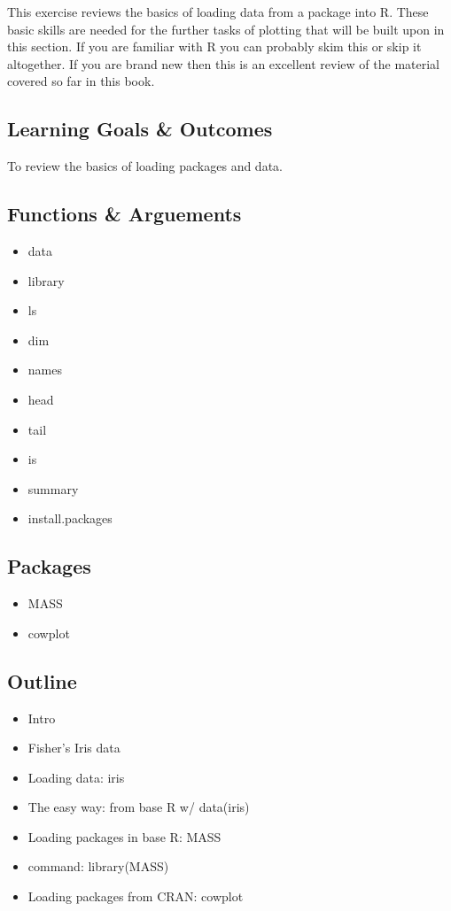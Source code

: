 \documentclass[]{book}
\providecommand{\tightlist}{%
  \setlength{\itemsep}{0pt}\setlength{\parskip}{0pt}}
\theoremstyle{definition}
\theoremstyle{definition}
\theoremstyle{definition}
\theoremstyle{remark}
\begin{document}
This exercise reviews the basics of loading data from a package into R.
These basic skills are needed for the further tasks of plotting that
will be built upon in this section. If you are familiar with R you can
probably skim this or skip it altogether. If you are brand new then this
is an excellent review of the material covered so far in this book.

\subsection{Learning Goals \& Outcomes}\label{learning-goals-outcomes-1}

To review the basics of loading packages and data.

\subsection{Functions \& Arguements}\label{functions-arguements-3}

\begin{itemize}
\tightlist
\item
  data
\item
  library
\item
  ls
\item
  dim
\item
  names
\item
  head
\item
  tail
\item
  is
\item
  summary
\item
  install.packages
\end{itemize}

\subsection{Packages}\label{packages-4}

\begin{itemize}
\tightlist
\item
  MASS
\item
  cowplot
\end{itemize}

\subsection{Outline}\label{outline}

\begin{itemize}
\tightlist
\item
  Intro
\item
  Fisher's Iris data
\item
  Loading data: iris
\item
  The easy way: from base R w/ data(iris)
\item
  Loading packages in base R: MASS
\item
  command: library(MASS)
\item
  Loading packages from CRAN: cowplot
\end{itemize}
\end{document}
